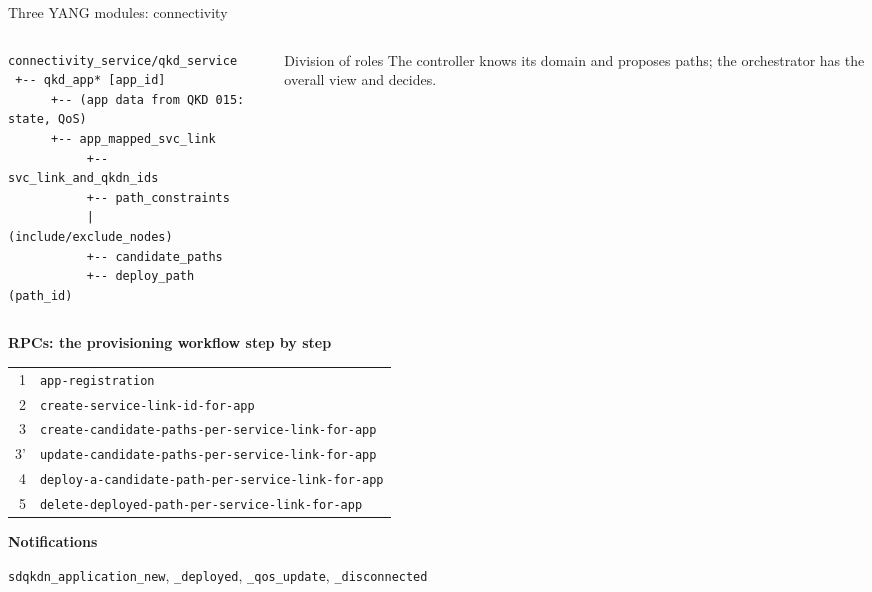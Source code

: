 \documentclass[10pt]{beamer}
\begin{document}
\begin{frame}[fragile]{Three YANG modules: connectivity}
  \begin{columns}[T]
    \begin{column}{0.52\textwidth}
\begin{lstlisting}[basicstyle=\ttfamily\fontsize{6}{6.8}\selectfont]
connectivity_service/qkd_service
 +-- qkd_app* [app_id]
      +-- (app data from QKD 015: state, QoS)
      +-- app_mapped_svc_link
           +-- svc_link_and_qkdn_ids
           +-- path_constraints
           |    (include/exclude_nodes)
           +-- candidate_paths
           +-- deploy_path (path_id)
\end{lstlisting}
    \end{column}
    \begin{column}{0.46\textwidth}
      \begin{block}{Division of roles}
        \small The controller knows its domain and \alert{proposes}
        paths; the orchestrator has the overall view and \alert{decides}.
      \end{block}
    \end{column}
  \end{columns}
  \vspace{1ex}
  \textbf{RPCs: the provisioning workflow step by step}\par
      \vspace{0.5ex}
      \scriptsize
      \begin{tabular}{@{}r@{\ \ }l@{}}
        1 & \texttt{app-registration}\\
        2 & \texttt{create-service-link-id-for-app}\\
        3 & \texttt{create-candidate-paths-per-service-link-for-app}\\
        3' & \texttt{update-candidate-paths-per-service-link-for-app}\\
        4 & \texttt{deploy-a-candidate-path-per-service-link-for-app}\\
        5 & \texttt{delete-deployed-path-per-service-link-for-app}
      \end{tabular}
  \vspace{1ex}

  \textbf{Notifications}\par
      \vspace{0.5ex}
      \scriptsize\texttt{sdqkdn\_application\_new}, \texttt{\_deployed},
      \texttt{\_qos\_update}, \texttt{\_disconnected}
\end{frame}
\end{document}
